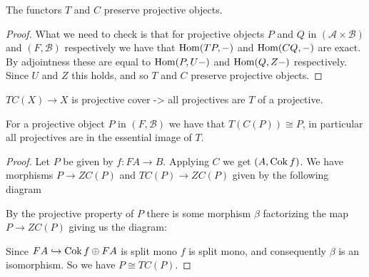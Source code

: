 \begin{cor}
	The functors $T$ and $C$ preserve projective objects.
	\begin{proof}
		What we need to check is that for projective objects $P$ and $Q$ in $(\mathcal A \times \mathcal B)$ and $(F, \mathcal B)$ respectively we have that $\operatorname{Hom}(TP, -)$ and $\operatorname{Hom}(CQ, -)$ are exact. By adjointness these are equal to $\operatorname{Hom}(P, U-)$ and $\operatorname{Hom}(Q, Z-)$ respectively. Since $U$ and $Z$ this holds, and so $T$ and $C$ preserve projective objects.
	\end{proof}
\end{cor}

$TC(X) \to X$ is projective cover -> all projectives are $T$ of a projective.

\begin{prop}\cite[Corollary~1.6c]{FGR75}
	For a projective object $P$ in $(F, \mathcal B)$ we have that $T(C(P)) \cong P$, in particular all projectives are in the essential image of $T$.
	\begin{proof}
		Let $P$ be given by $f:FA \to B$. Applying $C$ we get $(A, \operatorname{Cok} f)$. We have morphisms $P \to ZC(P)$ and $TC(P) \to ZC(P)$ given by the following diagram
		\begin{center}
		\end{center}
		By the projective property of $P$ there is some morphism $\beta$ factorizing the map $P \to ZC(P)$ giving us the diagram:
		\begin{center}
		\end{center}
		Since $FA \hookrightarrow \operatorname{Cok} f \oplus FA$ is split mono $f$ is split mono, and consequently $\beta$ is an isomorphism. So we have $P \cong TC(P)$.
	\end{proof}
\end{prop}

